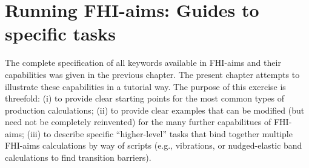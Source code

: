 \documentclass[12pt,a4paper,twoside,openany,titlepage,final]{book}
\begin{document}


































































\chapter{Running FHI-aims: Guides to specific tasks}
\label{CH:running}

The complete specification of all keywords available in FHI-aims and
their capabilities was given in the previous chapter. The present
chapter attempts to illustrate these capabilities in a tutorial
way. The purpose of this exercise is threefold: (i) to provide clear
starting points for the most common types of production calculations;
(ii) to provide clear examples that can be modified (but need not be
completely reinvented) for the many further capabilitues of FHI-aims;
(iii) to describe specific ``higher-level'' tasks that bind together
multiple FHI-aims calculations by way of scripts (e.g., vibrations, or
nudged-elastic band calculations to find transition barriers).
\end{document}
